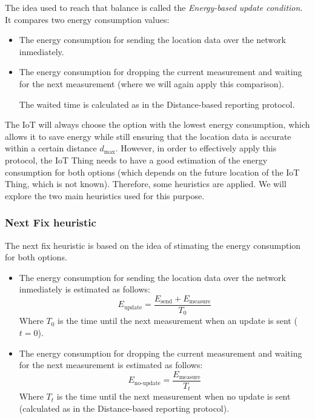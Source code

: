 The idea used to reach that balance is called the \emph{Energy-based update condition}. It compares two energy consumption values:
\begin{itemize}
    \item The energy consumption for sending the location data over the network inmediately.
    \item The energy consumption for dropping the current measurement and waiting for the next measurement (where we will again apply this comparison). 

    The waited time is calculated as in the Distance-based reporting protocol.
\end{itemize}

The IoT will always choose the option with the lowest energy consumption, which allows it to save energy while still ensuring that the location data is accurate within a certain distance $d_{\max}$. However, in order to effectively apply this protocol, the IoT Thing needs to have a good estimation of the energy consumption for both options (which depends on the future location of the IoT Thing, which is not known). Therefore, some heuristics are applied. We will explore the two main heuristics used for this purpose.

\subsubsection{Next Fix heuristic}

The next fix heuristic is based on the idea of stimating the energy consumption for both options.
\begin{itemize}
    \item The energy consumption for sending the location data over the network inmediately is estimated as follows:
    \begin{equation*}
        E_{\text{update}} = \dfrac{E_{\text{send}} + E_{\text{measure}}}{T_0}
    \end{equation*}
    Where $T_0$ is the time until the next measurement when an update is sent ($t=0$).
    \item The energy consumption for dropping the current measurement and waiting for the next measurement is estimated as follows:
    \begin{equation*}
        E_{\text{no-update}} = \dfrac{E_{\text{measure}}}{T_t}
    \end{equation*}
    Where $T_t$ is the time until the next measurement when no update is sent (calculated as in the Distance-based reporting protocol).
\end{itemize}

